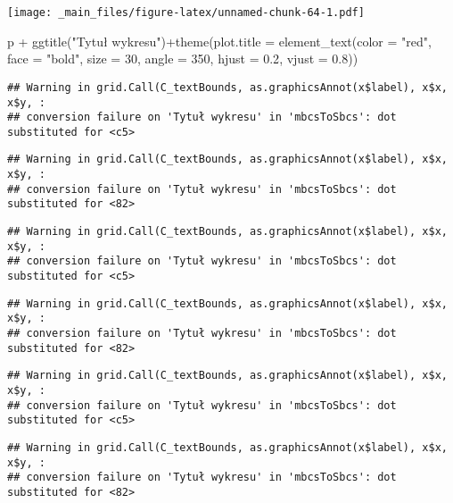 \documentclass[
]{book}
\newenvironment{Shaded}{\begin{snugshade}}{\end{snugshade}}
\newcommand{\AttributeTok}[1]{\textcolor[rgb]{0.77,0.63,0.00}{#1}}
\newcommand{\DecValTok}[1]{\textcolor[rgb]{0.00,0.00,0.81}{#1}}
\newcommand{\FloatTok}[1]{\textcolor[rgb]{0.00,0.00,0.81}{#1}}
\newcommand{\FunctionTok}[1]{\textcolor[rgb]{0.00,0.00,0.00}{#1}}
\newcommand{\NormalTok}[1]{#1}
\newcommand{\SpecialCharTok}[1]{\textcolor[rgb]{0.00,0.00,0.00}{#1}}
\newcommand{\StringTok}[1]{\textcolor[rgb]{0.31,0.60,0.02}{#1}}
\begin{document}
\texttt{[image: \_main\_files/figure-latex/unnamed-chunk-64-1.pdf]}

\begin{Shaded}
\begin{Highlighting}[]
\NormalTok{p }\SpecialCharTok{+} \FunctionTok{ggtitle}\NormalTok{(}\StringTok{"Tytuł wykresu"}\NormalTok{)}\SpecialCharTok{+}\FunctionTok{theme}\NormalTok{(}\AttributeTok{plot.title =} \FunctionTok{element\_text}\NormalTok{(}\AttributeTok{color =} \StringTok{"red"}\NormalTok{, }
                                                           \AttributeTok{face =} \StringTok{"bold"}\NormalTok{, }\AttributeTok{size =} \DecValTok{30}\NormalTok{, }\AttributeTok{angle =} \DecValTok{350}\NormalTok{, }\AttributeTok{hjust =} \FloatTok{0.2}\NormalTok{, }\AttributeTok{vjust =} \FloatTok{0.8}\NormalTok{))}
\end{Highlighting}
\end{Shaded}

\begin{verbatim}
## Warning in grid.Call(C_textBounds, as.graphicsAnnot(x$label), x$x, x$y, :
## conversion failure on 'Tytuł wykresu' in 'mbcsToSbcs': dot substituted for <c5>
\end{verbatim}

\begin{verbatim}
## Warning in grid.Call(C_textBounds, as.graphicsAnnot(x$label), x$x, x$y, :
## conversion failure on 'Tytuł wykresu' in 'mbcsToSbcs': dot substituted for <82>
\end{verbatim}

\begin{verbatim}
## Warning in grid.Call(C_textBounds, as.graphicsAnnot(x$label), x$x, x$y, :
## conversion failure on 'Tytuł wykresu' in 'mbcsToSbcs': dot substituted for <c5>
\end{verbatim}

\begin{verbatim}
## Warning in grid.Call(C_textBounds, as.graphicsAnnot(x$label), x$x, x$y, :
## conversion failure on 'Tytuł wykresu' in 'mbcsToSbcs': dot substituted for <82>
\end{verbatim}

\begin{verbatim}
## Warning in grid.Call(C_textBounds, as.graphicsAnnot(x$label), x$x, x$y, :
## conversion failure on 'Tytuł wykresu' in 'mbcsToSbcs': dot substituted for <c5>
\end{verbatim}

\begin{verbatim}
## Warning in grid.Call(C_textBounds, as.graphicsAnnot(x$label), x$x, x$y, :
## conversion failure on 'Tytuł wykresu' in 'mbcsToSbcs': dot substituted for <82>
\end{verbatim}
\end{document}
